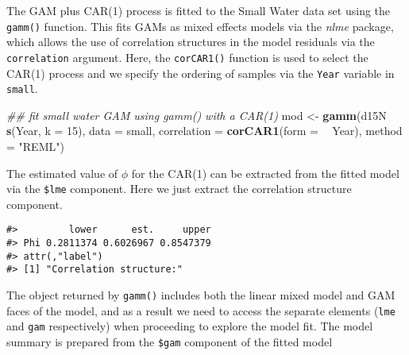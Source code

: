 \documentclass[12pt,]{article}
\newenvironment{Shaded}{\begin{snugshade}}{\end{snugshade}}
\newcommand{\CommentTok}[1]{\textcolor[rgb]{0.56,0.35,0.01}{\textit{#1}}}
\newcommand{\DataTypeTok}[1]{\textcolor[rgb]{0.13,0.29,0.53}{#1}}
\newcommand{\DecValTok}[1]{\textcolor[rgb]{0.00,0.00,0.81}{#1}}
\newcommand{\KeywordTok}[1]{\textcolor[rgb]{0.13,0.29,0.53}{\textbf{#1}}}
\newcommand{\NormalTok}[1]{#1}
\newcommand{\OperatorTok}[1]{\textcolor[rgb]{0.81,0.36,0.00}{\textbf{#1}}}
\newcommand{\StringTok}[1]{\textcolor[rgb]{0.31,0.60,0.02}{#1}}
\begin{document}
The GAM plus CAR(1) process is fitted to the Small Water data set using
the \texttt{gamm()} function. This fits GAMs as mixed effects models via
the \emph{nlme} package, which allows the use of correlation structures
in the model residuals via the \texttt{correlation} argument. Here, the
\texttt{corCAR1()} function is used to select the CAR(1) process and we
specify the ordering of samples via the \texttt{Year} variable in
\texttt{small}.

\begin{Shaded}
\begin{Highlighting}[]
\CommentTok{## fit small water GAM using gamm() with a CAR(1)}
\NormalTok{mod <-}\StringTok{ }\KeywordTok{gamm}\NormalTok{(d15N }\OperatorTok{~}\StringTok{ }\KeywordTok{s}\NormalTok{(Year, }\DataTypeTok{k =} \DecValTok{15}\NormalTok{), }\DataTypeTok{data =}\NormalTok{ small,}
            \DataTypeTok{correlation =} \KeywordTok{corCAR1}\NormalTok{(}\DataTypeTok{form =} \OperatorTok{~}\StringTok{ }\NormalTok{Year), }\DataTypeTok{method =} \StringTok{"REML"}\NormalTok{)}
\end{Highlighting}
\end{Shaded}

The estimated value of \(\phi\) for the CAR(1) can be extracted from the
fitted model via the \texttt{\$lme} component. Here we just extract the
correlation structure component.

\begin{Shaded}
\end{Shaded}

\begin{verbatim}
#>         lower      est.     upper
#> Phi 0.2811374 0.6026967 0.8547379
#> attr(,"label")
#> [1] "Correlation structure:"
\end{verbatim}

The object returned by \texttt{gamm()} includes both the linear mixed
model and GAM faces of the model, and as a result we need to access the
separate elements (\texttt{lme} and \texttt{gam} respectively) when
proceeding to explore the model fit. The model summary is prepared from
the \texttt{\$gam} component of the fitted model
\end{document}
